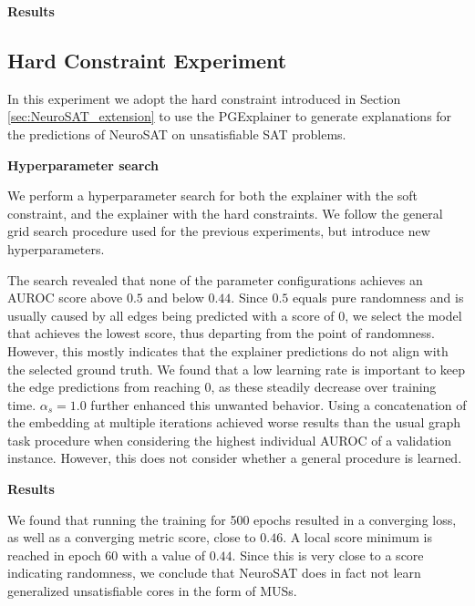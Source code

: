 \textbf{Results}\par


\subsection{Hard Constraint Experiment}
In this experiment we adopt the hard constraint introduced in Section \ref{sec:NeuroSAT_extension} to use the PGExplainer to generate explanations for the predictions of NeuroSAT on unsatisfiable SAT problems. \bigskip

\textbf{Hyperparameter search}\par
We perform a hyperparameter search for both the explainer with the soft constraint, and the explainer with the hard constraints. We follow the general grid search procedure used for the previous experiments, but introduce new hyperparameters. 

The search revealed that none of the parameter configurations achieves an AUROC score above $0.5$ and below $0.44$. Since $0.5$ equals pure randomness and is usually caused by all edges being predicted with a score of $0$, we select the model that achieves the lowest score, thus departing from the point of randomness. However, this mostly indicates that the explainer predictions do not align with the selected ground truth. We found that a low learning rate is important to keep the edge predictions from reaching 0, as these steadily decrease over training time. $\alpha_s=1.0$ further enhanced this unwanted behavior. Using a concatenation of the embedding at multiple iterations achieved worse results than the usual graph task procedure when considering the highest individual AUROC of a validation instance. However, this does not consider whether a general procedure is learned.

\textbf{Results}\par
We found that running the training for 500 epochs resulted in a converging loss, as well as a converging metric score, close to $0.46$. A local score minimum is reached in epoch 60 with a value of $0.44$. Since this is very close to a score indicating randomness, we conclude that NeuroSAT does in fact not learn generalized unsatisfiable cores in the form of MUSs.